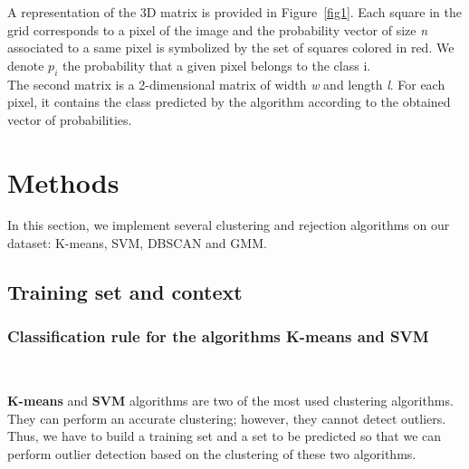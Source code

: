 \documentclass{siamart171218}
\begin{document}
A representation of the 3D matrix is provided in Figure~\ref{fig1}. Each square in the grid corresponds to a pixel of the image and the probability vector of size \textit{n} associated to a same pixel is symbolized by the set of squares colored in red. We denote $p_i$ the probability that a given pixel belongs to the class i. \\
The second matrix is a 2-dimensional matrix of width \textit{w} and length \textit{l}. For each pixel, it contains the class predicted by the algorithm according to the obtained vector of probabilities.

\bigskip

\section{Methods}

In this section, we implement several clustering and rejection algorithms on our dataset: K-means, SVM, DBSCAN and GMM.



\subsection{Training set and context}
\subsubsection{Classification rule for the algorithms K-means and SVM}\\
\label{section:rule_selection}

\textbf{K-means} and \textbf{SVM} algorithms are two of the most used clustering algorithms. They can perform an accurate clustering; however, they cannot detect outliers. Thus, we have to build a training set and a set to be predicted so that we can perform outlier detection based on the clustering of these two algorithms.
\end{document}

